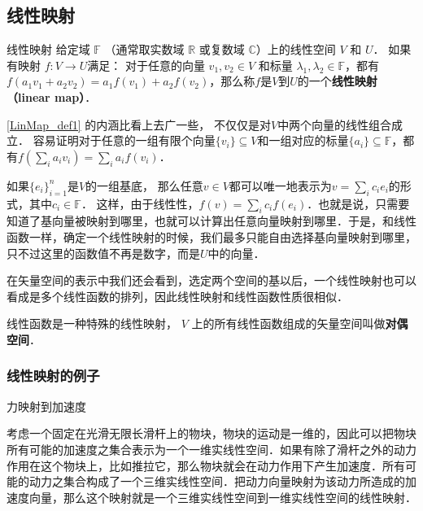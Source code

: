 
\begin{issues}
\end{issues}



\subsection{线性映射}
\begin{definition}{线性映射}\label{LinMap_def1}
给定域 $\mathbb F$ （通常取实数域 $\mathbb R$ 或复数域 $\mathbb C$）上的线性空间 $V$ 和 $U$． 如果有映射 $f:V\rightarrow U$满足： 对于任意的向量 ${v}_1, {v}_2\in V$ 和标量 $\lambda_1, \lambda_2 \in \mathbb{F}$，都有$f(a_1 {v}_1+a_2 {v}_2)=a_1f({v}_1)+a_2f({v}_2)$，那么称$f$是$V$到$U$的一个\textbf{线性映射（linear map）}．
\end{definition}

\autoref{LinMap_def1} 的内涵比看上去广一些， 不仅仅是对$V$中两个向量的线性组合成立． 容易证明对于任意的一组有限个向量$\{{v}_i\}\subseteq V$和一组对应的标量$\{a_i\}\subseteq\mathbb{F}$，都有$f(\sum_i a_i {v}_i)=\sum_i a_if({v}_i)$．

如果$\{{e}_i\}_{i=1}^n$是$V$的一组基底， 那么任意${v}\in V$都可以唯一地表示为${v}=\sum_i c_i {e}_i$的形式，其中$c_i\in\mathbb{F}$． 这样，由于线性性，$f({v})=\sum_ic_if({e}_i)$．也就是说，只需要知道了基向量被映射到哪里，也就可以计算出任意向量映射到哪里．于是，和线性函数一样，确定一个线性映射的时候，我们最多只能自由选择基向量映射到哪里，只不过这里的函数值不再是数字，而是$U$中的向量．

在矢量空间的表示中我们还会看到，选定两个空间的基以后，一个线性映射也可以看成是多个线性函数的排列，因此线性映射和线性函数性质很相似．

线性函数是一种特殊的线性映射， $V$ 上的所有线性函数组成的矢量空间叫做\textbf{对偶空间}．

\subsubsection{线性映射的例子}

\begin{example}{力映射到加速度}

考虑一个固定在光滑无限长滑杆上的物块，物块的运动是一维的，因此可以把物块所有可能的加速度之集合表示为一个一维实线性空间．如果有除了滑杆之外的动力作用在这个物块上，比如推拉它，那么物块就会在动力作用下产生加速度．所有可能的动力之集合构成了一个三维实线性空间．把动力向量映射为该动力所造成的加速度向量，那么这个映射就是一个三维实线性空间到一维实线性空间的线性映射．

\end{example}


